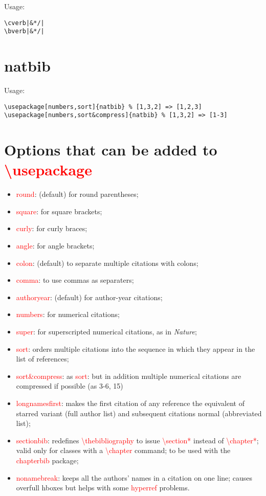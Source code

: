 Usage:
\begin{lstlisting}[language={[LaTeX]TeX}]
\cverb|&*/|
\bverb|&*/|
\end{lstlisting}

\section{natbib}
Usage:
\begin{lstlisting}[language={[LaTeX]TeX}]
\usepackage[numbers,sort]{natbib} % [1,3,2] => [1,2,3]
\usepackage[numbers,sort&compress]{natbib} % [1,3,2] => [1-3]
\end{lstlisting}

\section{Options that can be added to \textcolor{red}{\textbackslash usepackage}}
\begin{itemize}
\item \textcolor{red}{round}: (default) for round parentheses;
\item \textcolor{red}{square}: for square brackets;
\item \textcolor{red}{curly}: for curly braces;
\item \textcolor{red}{angle}: for angle brackets;
\item \textcolor{red}{colon}: (default) to separate multiple citations with colons;
\item \textcolor{red}{comma}: to use commas as separaters;
\item \textcolor{red}{authoryear}: (default) for author-year citations;
\item \textcolor{red}{numbers}: for numerical citations;
\item \textcolor{red}{super}: for superscripted numerical citations, as in \textit{Nature};
\item \textcolor{red}{sort}: orders multiple citations into  the sequence in which they appear in the list of references;
\item \textcolor{red}{sort\&compress}: as \textcolor{red}{sort}: but in addition multiple numerical citations are compressed if possible (as 3-6, 15)
\item \textcolor{red}{longnamesfirst}: makes the first citation of any reference the equivalent of starred variant (full author list) and subsequent citations normal (abbreviated list);
\item \textcolor{red}{sectionbib}: redefines \textcolor{red}{\textbackslash thebibliography} to issue \textcolor{red}{\textbackslash section*} instead of \textcolor{red}{\textbackslash chapter*}; valid only for classes with a \textcolor{red}{\textbackslash chapter} command; to be used with the \textcolor{red}{chapterbib} package;
\item \textcolor{red}{nonamebreak}: keeps all the authors' names in a citation on one line; causes overfull hboxes but helps with some \textcolor{red}{hyperref} problems.
\end{itemize}

